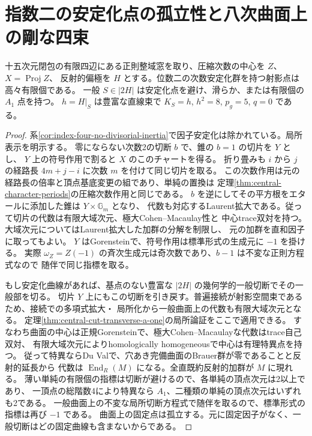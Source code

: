 \section{指数二の安定化点の孤立性と八次曲面上の剛な四束}
\label{sec:octic-surface-fixed-center}
\begin{theorem}\label{thm:octic-surface-isolated-inertia}
十五次元閉包の有限四辺にある正則整域窓を取り、圧縮次数の中心を $Z$、$X=\operatorname{Proj} Z$、
反射的偏極を $H$ とする。位数二の次数安定化群を持つ射影点は高々有限個である。
一般 $S\in|2H|$ は安定化点を避け、滑らか、または有限個の $A_1$ 点を持つ。
$h=H|_S$ は豊富な直線束で $K_S=h$, $h^2=8$, $p_g=5$, $q=0$ である。
\end{theorem}
\begin{proof}
系\ref{cor:index-four-no-divisorial-inertia}で因子安定化は除かれている。局所表示を明示する。
零にならない次数2の切断 $b$ で、錐の $b=1$ の切片を $Y$ とし、
$Y$ 上の符号作用で割ると $X$ のこのチャートを得る。
折り畳みも $i$ から $j$ の経路長 $4m+j-i$ に次数 $m$ を付けて同じ切片を取る。
この次数作用は元の経路長の倍率と頂点基底変更の組であり、単純の置換は
定理\ref{thm:central-character-periods}の圧縮次数作用と同じである。
$b$ を逆にしてその平方根をエタールに添加した錐は $Y\times\mathbb G_m$ となり、
代数も対応するLaurent拡大である。従って切片の代数は有限大域次元、極大Cohen--Macaulay性と
中心trace双対を持つ。大域次元についてはLaurent拡大した加群の分解を制限し、
元の加群を直和因子に取ってもよい。 $Y$ はGorensteinで、符号作用は標準形式の生成元に $-1$ を掛ける。
実際 $\omega_Z=Z(-1)$ の斉次生成元は奇次数であり、$b-1$ は不変な正則方程式なので
随伴で同じ指標を取る。

もし安定化曲線があれば、基点のない豊富な $|2H|$ の幾何学的一般切断でその一般部を切る。
切片 $Y$ 上にもこの切断を引き戻す。普遍接続が射影空間束であるため、接続での多項式拡大・
局所化から一般曲面上の代数も有限大域次元となる。
定理\ref{thm:central-cut-transverse-a-one}の局所論証をここで適用できる。
すなわち曲面の中心は正規Gorensteinで、極大Cohen--Macaulayな代数はtrace自己双対、
有限大域次元によりhomologically homogeneousで中心は有理特異点を持つ。
従って特異ならDu Valで、穴あき完備曲面のBrauer群が零であることと反射的延長から
代数は $\operatorname{End}_R(M)$ になる。全直既約反射的加群が $M$ に現れる。
薄い単純の有限個の指標は切断が避けるので、各単純の頂点次元は2以上であり、
一頂点の総階数4により特異なら $A_1$、二種類の単純の頂点次元はいずれも2である。
一般曲面上の不変な局所切断方程式で随伴を取るので、標準形式の指標は再び $-1$ である。
曲面上の固定点は孤立する。元に固定因子がなく、一般切断はどの固定曲線も含まないからである。


\end{proof}
